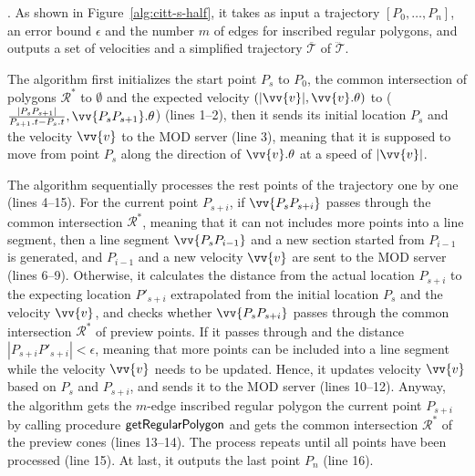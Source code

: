 .
As shown in Figure~\ref{alg:citt-s-half}, it takes as input a trajectory ${[P_0, \ldots, P_n]}$, an error bound $\epsilon$ and the number $m$ of edges for inscribed regular polygons, and outputs a set of velocities and a simplified  trajectory $\overline{\mathcal{T}}$ of $\dddot{\mathcal{T}}$.

The algorithm first initializes the start point $P_s$ to $P_0$, the common intersection of polygons $\mathcal{R}^*$ to $\emptyset$ and the expected velocity $(|\vv{v}|, \vv{v}.\theta)$ to ($\frac{|P_{s}P_{s+1}|}{P_{s+1}.t-P_s.t},\vv{P_{s}P_{s+1}}.\theta$) (lines 1--2), then it sends its initial location $P_s$ and the velocity $\vv{v}$ to the MOD server (line 3), meaning that it is supposed to move from point $P_s$ along the direction of $\vv{v}.\theta$ at a speed of $|\vv{v}|$.

The algorithm sequentially processes the rest points of the trajectory one by one (lines 4--15). 
For the current point $P_{s+i}$, if $\vv{P_sP_{s+i}}$ passes through the common intersection $\mathcal{R}^*$, meaning that it can not includes more points into a line segment, then a line segment $\vv{P_sP_{i-1}}$ and a new section started from  $P_{i-1}$ is generated, and $P_{i-1}$ and a new velocity $\vv{v}$ are sent to the MOD server (lines 6--9).
%
Otherwise, it calculates the distance from the actual location $P_{s+i}$ to the expecting location $P'_{s+i}$ extrapolated from the initial location $P_s$ and the velocity $\vv{v}$, and checks whether $\vv{P_sP_{s+i}}$ passes through the common intersection $\mathcal{R}^*$ of preview points.
If it passes through and the distance $|P_{s+i}P'_{s+i}|<\epsilon$, meaning that more points can be included into a line segment while the velocity $\vv{v}$ needs to be updated. Hence, it updates velocity $\vv{v}$ based on $P_s$ and $P_{s+i}$, and sends it to the MOD server (lines 10--12). 
%
Anyway, the algorithm gets the $m$-edge inscribed regular polygon \wrt the current point $P_{s+i}$ by calling procedure ${\mathsf{getRegularPolygon}}$ \cite{Lin:Cised} and gets the common intersection $\mathcal{R}^*$ of the preview cones (lines 13--14). The process repeats until all points have been processed (line 15).
At last, it outputs the last point $P_{n}$ (line 16).





